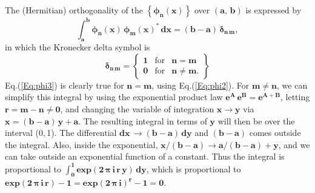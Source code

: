 \documentclass[12pt]{article}
\begin{document}
\noindent The (Hermitian) orthogonality of the
 $\mathbf{\left\{ \boldsymbol{\phi}_{n}(x) \right\}}$ over $\mathbf{(a,\,b)}$ 
  is expressed by
\begin{equation} \label{Eq:phi3}
\mathbf{\int_{a}^{b} \boldsymbol{\phi}_{n}(x) \, \boldsymbol{\phi}_{m}(x)^{\ast}  \, dx =
   (b-a)\,\boldsymbol{\delta}_{n\,m} },
\end{equation}
in which the Kronecker delta symbol is
\begin{equation} \label{Eq:kron}
\mathbf{\boldsymbol{\delta}_{n\,m}} = \left\{ \begin{array}{rcc}
                \mathbf{1} & \text{for} & \mathbf{n = m }\\
				\mathbf{0} & \text{for} & \mathbf{n \neq m}. 
				\end{array} \right\}
\end{equation}
Eq.(\ref{Eq:phi3}) is clearly true for $\mathbf{n = m}$, using Eq.(\ref{Eq:phi2}).
For $\mathbf{m \neq n}$, we can simplify this integral
  by using the exponential product law $\mathbf{e^{A}\,e^{B} = e^{A+B}}$,
  letting $\mathbf{r= m-n \neq 0}$, and changing the variable of integration
  $\mathbf{x \rightarrow y}$ via $\mathbf{x = (b-a)\,y + a}$.
The resulting integral in terms of $\mathbf{y}$ will then be over the interval (0,\,1).
The differential $\mathbf{dx \, \rightarrow (b-a)\,dy}$ and $\mathbf{(b-a)}$ comes outside the integral.
Also, inside the exponential, $\mathbf{x/(b-a) \rightarrow a/(b-a) + y}$, and
  we can take outside an exponential function of a constant. Thus the integral is
  proportional to $\mathbf{\int_{0}^{1} exp(2\,\boldsymbol{\pi}\,i\,r\,y)\,dy}$,
  which is proportional to $\mathbf{exp(2\,\boldsymbol{\pi}\,i\,r) - 1 = exp(2\,\boldsymbol{\pi}\,i)^{r} -1 = 0}$.\\
 
\end{document}
